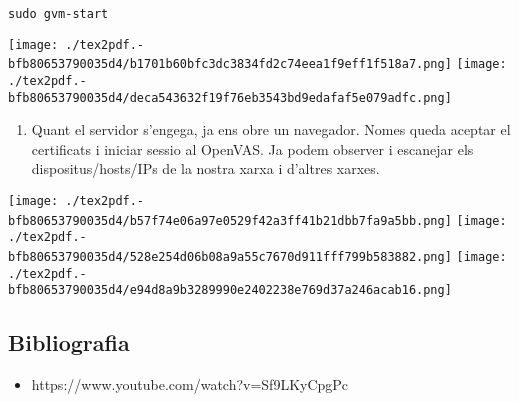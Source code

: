 \documentclass[]{article}
\providecommand{\tightlist}{%
  \setlength{\itemsep}{0pt}\setlength{\parskip}{0pt}}
\begin{document}
\texttt{sudo\ gvm-start}

\texttt{[image: ./tex2pdf.-bfb80653790035d4/b1701b60bfc3dc3834fd2c74eea1f9eff1f518a7.png]}
\texttt{[image: ./tex2pdf.-bfb80653790035d4/deca543632f19f76eb3543bd9edafaf5e079adfc.png]}

\begin{enumerate}
\def\labelenumi{\arabic{enumi}.}
\setcounter{enumi}{5}
\tightlist
\item
  Quant el servidor s'engega, ja ens obre un navegador. Nomes queda
  aceptar el certificats i iniciar sessio al OpenVAS. Ja podem observer
  i escanejar els dispositus/hosts/IPs de la nostra xarxa i d'altres
  xarxes.
\end{enumerate}

\texttt{[image: ./tex2pdf.-bfb80653790035d4/b57f74e06a97e0529f42a3ff41b21dbb7fa9a5bb.png]}
\texttt{[image: ./tex2pdf.-bfb80653790035d4/528e254d06b08a9a55c7670d911fff799b583882.png]}
\texttt{[image: ./tex2pdf.-bfb80653790035d4/e94d8a9b3289990e2402238e769d37a246acab16.png]}

\hypertarget{bibliografia}{%
\subsection{\texorpdfstring{\textbf{Bibliografia}}{Bibliografia}}\label{bibliografia}}

\begin{itemize}
\tightlist
\item
  https://www.youtube.com/watch?v=Sf9LKyCpgPc
\end{itemize}
\end{document}
